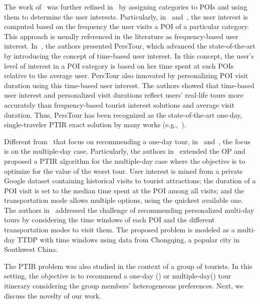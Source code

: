 {The work of~\cite{choudhury-automatic:10}  was further refined in~\cite{brilhante-where:13,yu-personalized:16,lim-personalized:18} by assigning categories to POIs and using them to determine the user interests. Particularly, in~\cite{brilhante-where:13} and~\cite{yu-personalized:16}, the user interest is computed based on the frequency the user visits a POI of a particular category. This approach is usually referenced in the literature as frequency-based user interest. In~\cite{lim-personalized:18}, the authors presented PersTour, which advanced the state-of-the-art by introducing the concept of time-based user interest. In this concept, the user’s level of interest in a POI category is based on her time spent at such POIs relative to the average user. PersTour also innovated by personalizing POI visit duration using this time-based user interest. The authors showed that time-based user interest and personalized visit durations reflect users' real-life tours more accurately than frequency-based tourist interest solutions and average visit duration. Thus, PersTour has been recognized as the state-of-the-art one-day, single-traveler PTIR exact solution by many works (e.g.,~\cite{zhang-encoder:24,halder-survey:24}).}  

{Different from~\cite{choudhury-automatic:10,brilhante-where:13,yu-personalized:16,lim-personalized:18} that focus on recommending a one-day tour, in~\cite{friggstad:18} and~\cite{zhong-optimization:23}, the focus is on the multiple-day case. Particularly, the authors in~\cite{friggstad:18} extended the OP and proposed a PTIR algorithm for the multiple-day case where the objective is to optimize for the value of the worst tour. User interest is mined from a private Google dataset containing historical visits to tourist attractions; the duration of a POI visit is set to the median time spent at the POI among all visits; and the transportation mode allows multiple options, using the quickest available one. The authors in~\cite{zhong-optimization:23} addressed the challenge of recommending personalized multi-day tours by considering the time windows of each POI and the different transportation modes to visit them. The proposed problem is modeled as a multi-day TTDP with time windows using data from Chongqing, a popular city in Southwest China.} 

{The PTIR problem was also studied in the context of a group of tourists. In this setting, the objective is to recommend a one-day (\cite{lim-towards:16,yin-group:19}) or multiple-day(\cite{kargar-socially:21}) tour itinerary considering the group members’ heterogeneous preferences. Next, we discuss the novelty of our work.}


